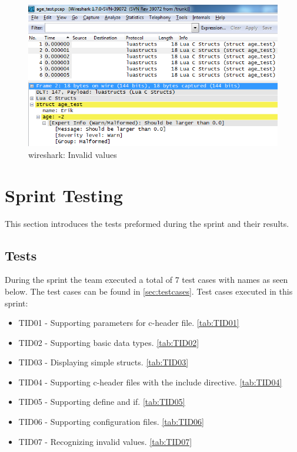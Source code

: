 \begin{figure}[htb]
	\center
	\includegraphics[width=\textwidth]{./sprints/img/wireshark_outofrange}
	\caption{\Gls{wireshark}: Invalid values\label{fig:sp1rangerule}}
\end{figure}


\section{Sprint Testing}
\label{sec:sp1:test}
This section introduces the tests preformed during the sprint and their
results.

\subsection{Tests}
During the sprint the team executed a total of 7 test cases with names as seen
below. The test cases can be found in \autoref{sec:testcases}. 
Test cases executed in this sprint:
\begin{itemize}
	\item TID01 - Supporting parameters for \Gls{c}-\gls{header} file. \autoref{tab:TID01}
	\item TID02 - Supporting basic data types. \autoref{tab:TID02}
	\item TID03 - Displaying simple \glspl{struct}. \autoref{tab:TID03}
	\item TID04 - Supporting \Gls{c}-\gls{header} files with the \gls{include} directive. \autoref{tab:TID04}
	\item TID05 - Supporting \gls{define} and \gls{if}. \autoref{tab:TID05}
	\item TID06 - Supporting configuration files. \autoref{tab:TID06}
	\item TID07 - Recognizing invalid values. \autoref{tab:TID07}
\end{itemize}

